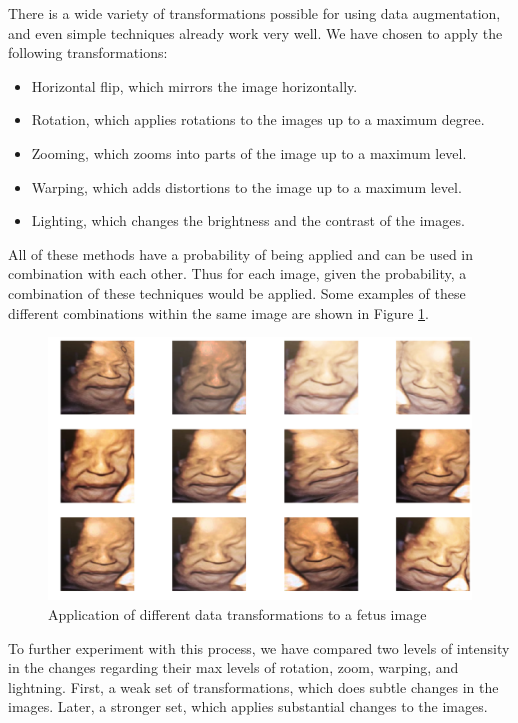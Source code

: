 There is a wide variety of transformations possible for using data augmentation, and even simple techniques already work very well. We have chosen to apply the following transformations:

\begin{itemize}
    \item Horizontal flip, which mirrors the image horizontally. 
    \item Rotation, which applies rotations to the images up to a maximum degree.
    \item Zooming, which zooms into parts of the image up to a maximum level.
    \item Warping, which adds distortions to the image up to a maximum level.
    \item Lighting, which changes the brightness and the contrast of the images.
\end{itemize}

All of these methods have a probability of being applied and can be used in combination with each other. Thus for each image, given the probability, a combination of these techniques would be applied. Some examples of these different combinations within the same image are shown in Figure \ref{fig:data_augmentation}.

\begin{figure}[h!tp]
    \centering
    \includegraphics[width=.75\textwidth]{imgs/chap5_data_augmentation.png}
    \caption{Application of different data transformations to a fetus image}
    \label{fig:data_augmentation}
\end{figure}

To further experiment with this process, we have compared two levels of intensity in the changes regarding their max levels of rotation, zoom, warping, and lightning. First, a weak set of transformations, which does subtle changes in the images. Later, a stronger set, which applies substantial changes to the images.

